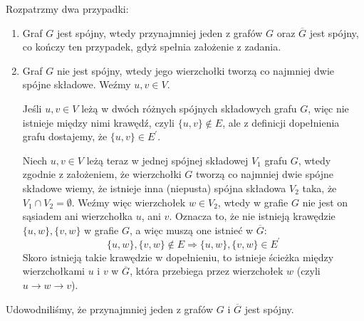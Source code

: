 \documentclass[a4paper,12pt]{article}
\newcommand{\comp}[1]{\overline{ #1 }} 					%
\begin{document}
\noindent Rozpatrzmy dwa przypadki:
\begin{enumerate}
    \item Graf $G$ jest spójny, wtedy przynajmniej jeden z grafów $G$ oraz 
    $\comp{G}$ jest spójny, co kończy ten przypadek, gdyż spełnia założenie
    z zadania.
    \item Graf $G$ nie jest spójny, wtedy jego wierzchołki tworzą co najmniej dwie
    spójne składowe. Weźmy $u, v \in V$. 
    
    Jeśli $u, v \in V$ leżą w dwóch różnych spójnych składowych grafu $G$, więc 
    nie istnieje między nimi krawędź, czyli $\{ u, v \} \notin E$, ale z definicji 
    dopełnienia grafu dostajemy, że $\{ u, v \} \in E^\prime$.

    Niech $u, v \in V$ leżą teraz w jednej spójnej składowej $V_1$ grafu $G$, wtedy
    zgodnie z założeniem, że wierzchołki $G$ tworzą co najmniej dwie spójne składowe 
    wiemy, że istnieje inna (niepusta) spójna składowa $V_2$ taka, że 
    $V_1 \cap V_2 = \emptyset$. Weźmy więc wierzchołek $w \in V_2$, wtedy w grafie
    $G$ nie jest on sąsiadem ani wierzchołka $u$, ani $v$. Oznacza to, że nie
    istnieją krawędzie $\{ u, w \}, \{ v, w \}$ w grafie $G$, a więc muszą one 
    istnieć w $\comp{G}$:
    \[ \{ u, w \}, \{ v, w \} \notin E \Rightarrow \{ u, w \}, \{ v, w \} \in E^\prime \]
    Skoro istnieją takie krawędzie w dopełnieniu, to istnieje ścieżka między 
    wierzchołkami $u$ i $v$ w $\comp{G}$, która przebiega przez wierzchołek $w$
    (czyli $u \to w \to v$).
\end{enumerate}
Udowodniliśmy, że przynajmniej jeden z grafów $G$ i $\comp{G}$ jest spójny.
\end{document}
